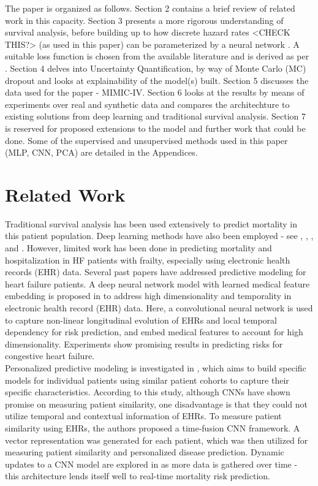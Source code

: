 \documentclass[%
 reprint,
 amsmath,amssymb,
 aps,
]{revtex4-2}
\begin{document}
The paper is organized as follows. Section 2 contains a brief review of related work in this capacity. Section 3 presents a more rigorous understanding of survival analysis, before building up to how discrete hazard rates \cite{Gensheimer_Narasimhan_2019} <CHECK THIS?> (as used in this paper) can be parameterized by a neural network \cite{kvamme_continuous_2019}. A suitable loss function is chosen from the available literature and is derived as per \cite{kvamme_continuous_2019}. Section 4 delves into Uncertainty Quantification, by way of Monte Carlo (MC) dropout and looks at explainability of the model(s) built. Section 5 discusses the data used for the paper - MIMIC-IV. Section 6 looks at the results by means of experiments over real and synthetic data and compares the architechture to existing solutions from deep learning and traditional survival analysis. Section 7 is reserved for proposed extensions to the model and further work that could be done. Some of the supervised and unsupervised methods used in this paper (MLP, CNN, PCA) are detailed in the Appendices.

\section{\label{rescon}Related Work}
Traditional survival analysis has been used extensively to predict mortality in this patient population. Deep learning methods have also been employed - see \cite{e2edlgjoreski}, \cite{nirschl2018deep}, \cite{10.1001/jamanetworkopen.2019.6972}, \cite{asolares2020} and \cite{lorenzoni_2019}. However, limited work has been done in predicting mortality and hospitalization in HF patients with frailty, especially using electronic health records (EHR) data. Several past papers have addressed predictive modeling for heart failure patients. A deep neural network model with learned medical feature embedding is proposed in \cite{che2017} to address high dimensionality and temporality in electronic health record (EHR) data. Here, a convolutional neural network is used to capture non-linear longitudinal evolution of EHRs and local temporal dependency for risk prediction, and embed medical features to account for high dimensionality. Experiments show promising results in predicting risks for congestive heart failure.\\

Personalized predictive modeling is investigated in \cite{suo2017personalized}, which aims to build specific models for individual patients using similar patient cohorts to capture their specific characteristics. According to this study, although CNNs have shown promise on measuring patient similarity, one disadvantage is that they could not utilize temporal and contextual information of EHRs. To measure patient similarity using EHRs, the authors proposed a time-fusion CNN framework. A vector representation was generated for each patient, which was then utilized for measuring patient similarity and personalized disease prediction. Dynamic updates to a CNN model are explored in \cite{brand2018real} as more data is gathered over time - this architecture lends itself well to real-time mortality risk prediction.\\
\end{document}
